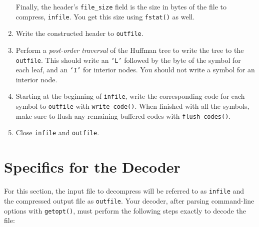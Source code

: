 \documentclass[11pt]{article}
\begin{document}
\begin{enumerate}
    Finally, the header's \texttt{file\_size} field is the size in bytes
    of the file to compress, \texttt{infile}. You get this size using
    \texttt{fstat()} as well.

  \item Write the constructed header to \texttt{outfile}.

  \item Perform a \emph{post-order traversal} of the Huffman tree to
    write the tree to the \texttt{outfile}. This should write an
    \texttt{`L'} followed by the byte of the symbol for each leaf, and
    an \texttt{`I'} for interior nodes. You should not write a symbol
    for an interior node.

  \item Starting at the beginning of \texttt{infile}, write the
    corresponding code for each symbol to \texttt{outfile} with
    \texttt{write\_code()}. When finished with all the symbols, make
    sure to flush any remaining buffered codes with
    \texttt{flush\_codes()}.

  \item Close \texttt{infile} and \texttt{outfile}.
\end{enumerate}

\section{Specifics for the Decoder}

For this section, the input file to decompress will be referred to as
\texttt{infile} and the compressed output file as \texttt{outfile}. Your
decoder, after parsing command-line options with \texttt{getopt()}, must
perform the following steps exactly to decode the file:
\end{document}

